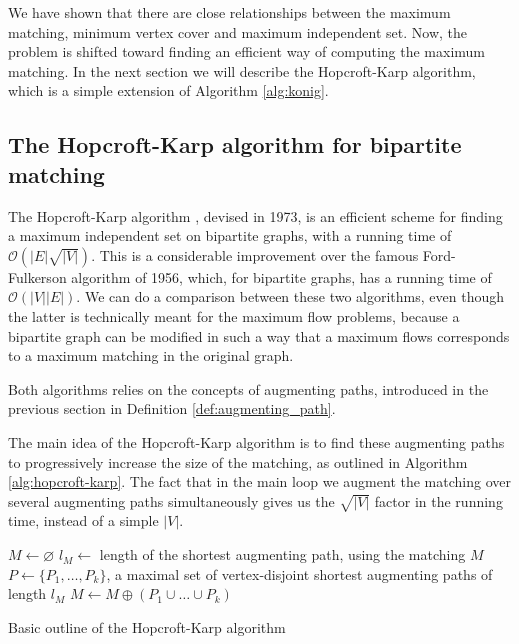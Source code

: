 We have shown that there are close relationships between the maximum matching, minimum vertex cover and maximum independent set. Now, the problem is shifted toward finding an efficient way of computing the maximum matching. In the next section we will describe the Hopcroft-Karp algorithm, which is a simple extension of Algorithm \ref{alg:konig}.

\subsection{The Hopcroft-Karp algorithm for bipartite matching} \label{sec:hopcroft_karp}

The Hopcroft-Karp algorithm \cite{hopcroft_karp}, devised in 1973, is an efficient scheme for finding a maximum independent set on bipartite graphs, with a running time of $\mathcal{O}\left( |E|\sqrt{|V|} \right)$. This is a considerable improvement over the famous Ford-Fulkerson algorithm of 1956, which, for bipartite graphs, has a running time of $\mathcal{O}\left( |V||E| \right)$. We can do a comparison between these two algorithms, even though the latter is technically meant for the maximum flow problems, because a bipartite graph can be modified in such a way that a maximum flows corresponds to a maximum matching in the original graph.

Both algorithms relies on the concepts of augmenting paths, introduced in the previous section in Definition \ref{def:augmenting_path}.

The main idea of the Hopcroft-Karp algorithm is to find these augmenting paths to progressively increase the size of the matching, as outlined in Algorithm \ref{alg:hopcroft-karp}. The fact that in the main loop we augment the matching over several augmenting paths simultaneously gives us the $\sqrt{|V|}$ factor in the running time, instead of a simple $|V|$.

\begin{algorithm}[h]
	\begin{algorithmic}
		\State $M \gets \varnothing$
		\Repeat
		\State $l_M \gets$ length of the shortest augmenting path, using the matching $M$
		\State $P \gets \{ P_1,\dots,P_k \}$, a maximal set of vertex-disjoint shortest augmenting paths of length $l_M$
		\State $M \gets M \oplus (P_1 \cup \dots \cup P_k )$
	\end{algorithmic}
	\caption{Basic outline of the Hopcroft-Karp algorithm} \label{alg:hopcroft-karp}
\end{algorithm}

